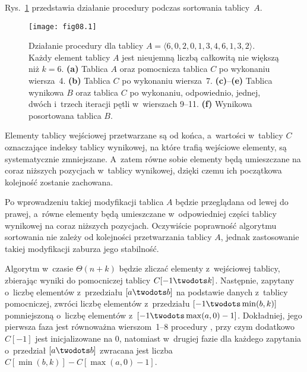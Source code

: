 
\exercise %
Rys.~\ref{fig:8.2-1} przedstawia działanie procedury  podczas sortowania tablicy~$A$.
\begin{figure}[ht]
	\begin{center}
		\texttt{[image: fig08.1]}
	\end{center}
	\caption{Działanie procedury  dla tablicy $A=\langle6,0,2,0,1,3,4,6,1,3,2\rangle$. Każdy element tablicy $A$ jest nieujemną liczbą całkowitą nie większą niż $k=6$. {\sffamily\bfseries(a)} Tablica $A$ oraz pomocnicza tablica $C$ po wykonaniu wiersza~4. {\sffamily\bfseries(b)} Tablica $C$ po wykonaniu wiersza~7. {\sffamily\bfseries(c)}--{\sffamily\bfseries(e)} Tablica wynikowa $B$ oraz tablica $C$ po wykonaniu, odpowiednio, jednej, dwóch i~trzech iteracji pętli  w~wierszach 9--11. {\sffamily\bfseries(f)} Wynikowa posortowana tablica $B$.} \label{fig:8.2-1}
\end{figure}

\exercise %
Elementy tablicy wejściowej przetwarzane są od końca, a~wartości w~tablicy $C$ oznaczające indeksy tablicy wynikowej, na które trafią wejściowe elementy, są systematycznie zmniejszane. A~zatem równe sobie elementy będą umieszczane na coraz niższych pozycjach w~tablicy wynikowej, dzięki czemu ich początkowa kolejność zostanie zachowana.

\exercise %
Po wprowadzeniu takiej modyfikacji tablica $A$ będzie przeglądana od lewej do prawej, a~równe elementy będą umieszczane w~odpowiedniej części tablicy wynikowej na coraz niższych pozycjach. Oczywiście poprawność algorytmu sortowania nie zależy od kolejności przetwarzania tablicy $A$, jednak zastosowanie takiej modyfikacji zaburza jego stabilność.

\exercise %
Algorytm w~czasie $\Theta(n+k)$ będzie zliczać elementy z~wejściowej tablicy, zbierając wyniki do pomocniczej tablicy $C[-1\twodots k]$. Następnie, zapytany o~liczbę elementów z~przedziału $[a\twodots b]$ na podstawie danych z~tablicy pomocniczej, zwróci liczbę elementów z~przedziału $[-1\twodots\min(b,k)]$ pomniejszoną o~liczbę elementów z~$[-1\twodots\max(a,0)-1]$. Dokładniej, jego pierwsza faza jest równoważna wierszom~1\nobreakdash--8 procedury , przy czym dodatkowo $C[-1]$ jest inicjalizowane na 0, natomiast w~drugiej fazie dla każdego zapytania o~przedział $[a\twodots b]$ zwracana jest liczba $C[\min(b,k)]-C[\max(a,0)-1]$.

